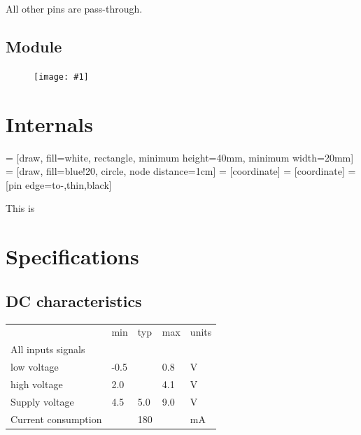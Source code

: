 \documentclass{article}
\newcommand{\heavyline}{\specialrule{1pt}{1pt}{1pt}}
\newcommand{\pngw}[2]{
\begin{figure}[H]
\begin{center}
\texttt{[image: \#1]}
\end{center}
\end{figure}
}
\begin{document}
All other pins are pass-through.

\subsection{Module}

\pngw{img/gameduino-3x-dazzler/pinout}{1.0}

\newpage
\section{Internals}



 = [draw, fill=white, rectangle, minimum height=40mm, minimum width=20mm]
 = [draw, fill=blue!20, circle, node distance=1cm]
 = [coordinate]
 = [coordinate]
 = [pin edge={to-,thin,black}]


\begin{center}
\end{center}

This is 

\newpage
\section{Specifications}\label{electrical-characteristics}

\subsection{DC characteristics}
\vspace{10 pt}
{\renewcommand{\arraystretch}{1.2}%

\begin{tabularx}{\linewidth}{XC{40pt}C{40pt}C{40pt}C{40pt}}
& min & typ & max & units \\ \heavyline

All inputs signals & & & & \\
\hspace{10pt}low voltage & -0.5 & & 0.8 & V \\
\hspace{10pt}high voltage & 2.0 &   & 4.1 & V \\ \hline
Supply voltage        & 4.5 & 5.0 & 9.0 & V                   \\ \hline
Current consumption   & & 180 & & mA                   \\ \hline

\end{tabularx}}
\vspace{10 pt}
\end{document}
